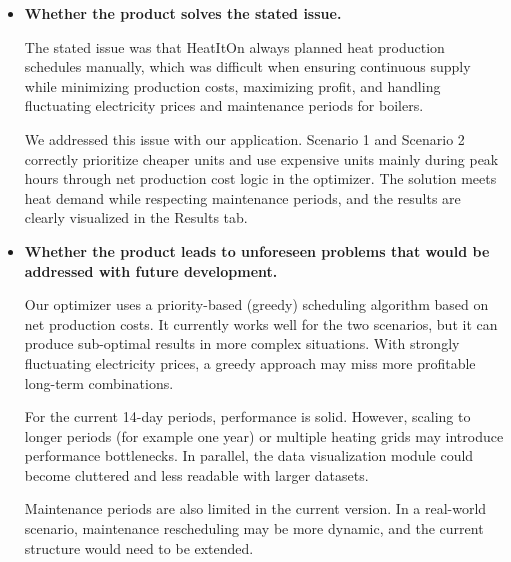 \begin{itemize}
    \item \textbf{Whether the product solves the stated issue.}
    \par\hspace*{1.5em}The stated issue was that HeatItOn always planned heat production schedules manually, which was difficult when ensuring continuous supply while minimizing production costs, maximizing profit, and handling fluctuating electricity prices and maintenance periods for boilers.
    \par\hspace*{1.5em}We addressed this issue with our application. Scenario 1 and Scenario 2 correctly prioritize cheaper units and use expensive units mainly during peak hours through net production cost logic in the optimizer. The solution meets heat demand while respecting maintenance periods, and the results are clearly visualized in the Results tab.


    \item \textbf{Whether the product leads to unforeseen problems that would be addressed with future development.}
    \par\hspace*{1.5em}Our optimizer uses a priority-based (greedy) scheduling algorithm based on net production costs. It currently works well for the two scenarios, but it can produce sub-optimal results in more complex situations. With strongly fluctuating electricity prices, a greedy approach may miss more profitable long-term combinations.
    \par\hspace*{1.5em}For the current 14-day periods, performance is solid. However, scaling to longer periods (for example one year) or multiple heating grids may introduce performance bottlenecks. In parallel, the data visualization module could become cluttered and less readable with larger datasets.
    \par\hspace*{1.5em}Maintenance periods are also limited in the current version. In a real-world scenario, maintenance rescheduling may be more dynamic, and the current structure would need to be extended.



\end{itemize}
